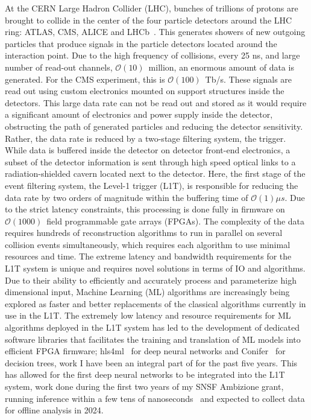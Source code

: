 \documentclass[12pt]{iopart}
\begin{document}
At the CERN Large Hadron Collider (LHC), bunches of trillions of protons are brought to collide in the center of the four particle detectors around the LHC ring: ATLAS, CMS, ALICE and LHCb~\cite{LyndonEvans_2008}. This generates showers of new outgoing particles that produce signals in the particle detectors located around the interaction point. Due to the high frequency of collisions, every 25 ns, and large number of read-out channels, $\mathcal{O}(10)$~million, an enormous amount of data is generated. For the CMS experiment, this is $\mathcal{O}(100)$~Tb/s. These signals are read out using custom electronics mounted on support structures inside the detectors. This large data rate can not be read out and stored as it would require a significant amount of electronics and power supply inside the detector, obstructing the path of generated particles and reducing the detector sensitivity. Rather, the data rate is reduced by a two-stage filtering system, the trigger. While data is buffered inside the detector on detector front-end electronics, a subset of the detector information is sent through high speed optical links to a radiation-shielded cavern located next to the detector. Here, the first stage of the event filtering system, the Level-1 trigger (L1T), is responsible for reducing the data rate by two orders of magnitude within the buffering time of $\mathcal{O}(1)\mu s$. Due to the strict latency constraints, this processing is done fully in firmware on $\mathcal{O}(1000)$~field programmable gate arrays (FPGAs). The complexity of the data requires hundreds of reconstruction algorithms to run in parallel on several collision events simultaneously, which requires each algorithm to use minimal resources and time. The extreme latency and bandwidth requirements for the L1T system is unique and requires novel solutions in terms of IO and algorithms. Due to their ability to efficiently and accurately process and parameterize high dimensional input, Machine Learning (ML) algorithms are increasingly being explored as faster and better replacements of the classical algorithms currently in use in the L1T. The extremely low latency and resource requirements for ML algorithms deployed in the L1T system has led to the development of dedicated software libraries that facilitates the training and translation of ML models into efficient FPGA firmware; hls4ml~\cite{hls4ml,qkerashls4ml,Aarrestad_2021,Ghielmetti_2022} for deep neural networks and Conifer~\cite{Summers_2020} for decision trees, work I have been an integral part of for the past five years. This has allowed for the first deep neural networks to be integrated into the L1T system, work done during the first two years of my SNSF Ambizione grant, running inference within a few tens of nanoseconds~\cite{CMS-DP-2023-079} and expected to collect data for offline analysis in 2024.
\end{document}
